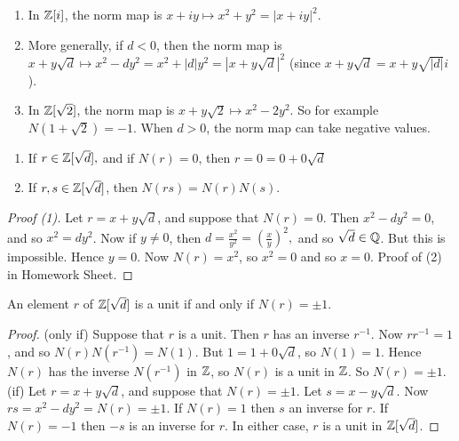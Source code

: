 \documentclass[twoside]{scrartcl}
\begin{document}
\begin{examples}\begin{enumerate}
\item In $\mathbb{Z}[i]$, the norm map is $x + iy \mapsto x^2 + y^2 = |x + iy|^2$.
\item More generally, if $d < 0$, then the norm map is $x+ y\sqrt{d} \mapsto x^2 - dy^2 = x^2 + |d|y^2 = |x + y\sqrt{d}|^2$ (since $x + y\sqrt{d} = x+y\sqrt{|d|}i$).
\item In $\mathbb{Z}[\sqrt{2}]$, the norm map is $x + y\sqrt{2} \mapsto x^2 - 2y^2$. So for example $N(1 + \sqrt{2}) = -1$. When $d > 0$, the norm map can take negative values.
 \end{enumerate}\end{examples}\vspace*{10pt}
 
\begin{proposition}\begin{enumerate}
 \item If $r \in \mathbb{Z}[\sqrt{d}],$ and if $N(r) = 0$, then $r = 0 = 0 + 0\sqrt{d}$
 \item 	If $r,s \in \mathbb{Z}[\sqrt{d}]$, then $N(rs) = N(r)N(s)$.
 \end{enumerate}\end{proposition}
\begin{proof} [Proof (1)] 
Let $r = x + y\sqrt{d}$, and suppose that $N(r) = 0$. Then $x^2 - dy^2 = 0$, and so $x^2 = dy^2$. Now if $y \neq 0$, then $d =\frac{x^2}{y^2} = \left(\frac{x}{y}\right)^2,$ and so $\sqrt{d} \in \mathbb{Q}$. But this is impossible. Hence $y = 0$. Now $N(r) = x^2$, so $x^2 = 0$ and so $x = 0$. Proof of (2) in Homework Sheet.
\end{proof}\vspace*{5pt}



\begin{proposition} An   
 element $r$ of $\mathbb{Z}[\sqrt{d}]$ is a unit if and only if $N(r) = \pm 1$. \end{proposition}
\begin{proof}
(only if) Suppose that $r$ is a unit. Then $r$ has an inverse $r^{-1}$. Now $rr^{-1} = 1$, and so $N(r)N(r^{-1}) = N(1)$. But $1 = 1 + 0 \sqrt{d}$, so $N(1) = 1$. Hence $N(r)$ has the inverse $N(r^{-1})$ in $\mathbb{Z}$, so $N(r)$ is a unit in $\mathbb{Z}$. So $N(r) = \pm 1$. \\

(if) Let $r = x + y\sqrt{d}$, and suppose that $N(r) = \pm 1$. Let $s = x - y\sqrt{d}$. Now $rs = x^2 - dy^2 = N(r) = \pm 1$. If $N(r) = 1$ then $s$ an inverse for $r$. If $N(r) = -1$  then $-s$ is an inverse for $r$. In either case, $r$ is a unit in $\mathbb{Z}[\sqrt{d}]$.
\end{proof}\vspace*{5pt}
\end{document}
